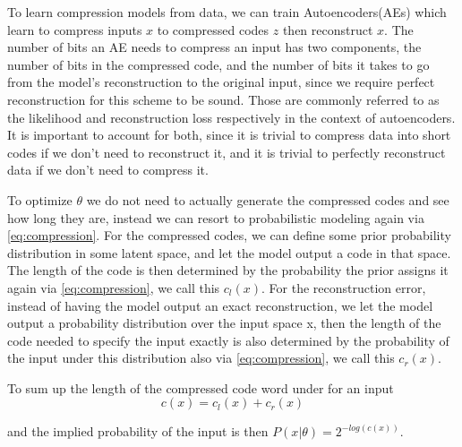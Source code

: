 \documentclass[../main.tex]{subfiles}
\begin{document}
To learn compression models from data, we can train Autoencoders(AEs) which learn to compress inputs $x$ to compressed codes $z$ then reconstruct $x$. 
The number of bits an AE needs to compress an input has two components, the number of bits in the compressed code, and the number of bits it takes to go from the model's reconstruction to the original input, since we require perfect reconstruction for this scheme to be sound.
Those are commonly referred to as the likelihood and reconstruction loss respectively in the context of autoencoders. It is important to account for both, since it is trivial to compress data into short codes if we don't need to reconstruct it, and it is trivial to perfectly reconstruct data if we don't need to compress it.

To optimize $\theta$ we do not need to actually generate the compressed codes and see how long they are, instead we can resort to probabilistic modeling again via \cref{eq:compression}. 
For the compressed codes, we can define some prior probability distribution in some latent space, and let the model output a code in that space. The length of the code is then determined by the probability the prior assigns it again via \cref{eq:compression}, we call this $c_{l}(x)$. For the reconstruction error, instead of having the model output an exact reconstruction, we let the model output a probability distribution over the input space x, then the length of the code needed to specify the input exactly is also determined by the probability of the input under this distribution also via \cref{eq:compression}, we call this $c_{r}(x)$.

To sum up the length of the compressed code word under for an input 
\begin{equation}
    \label{eq:compression_cost}
    c(x) = c_{l}(x) + c_{r}(x)
\end{equation}{}

and the implied probability of the input is then $P(x|\theta) = 2^{-log(c(x))}$. 


\end{document}
